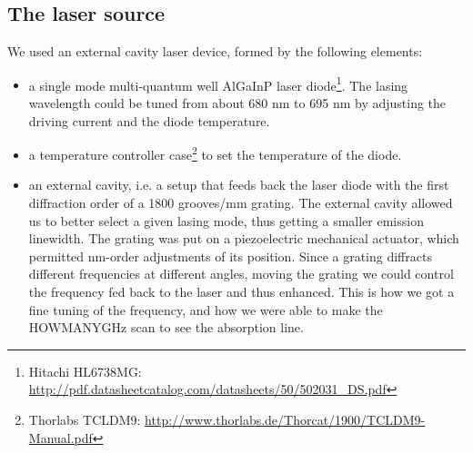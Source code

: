 \documentclass[a4paper,11pt]{article}
\begin{document}
\subsection{The laser source}
We used an external cavity laser device, formed by the following elements:
\begin{itemize}
\item a single mode multi-quantum well AlGaInP laser diode\footnote{Hitachi HL6738MG: \url{http://pdf.datasheetcatalog.com/datasheets/50/502031_DS.pdf}}.
 The lasing wavelength could be tuned from about 680 nm to 695 nm by adjusting the driving current and the diode temperature.
\item a temperature controller case\footnote{Thorlabs TCLDM9: \url{http://www.thorlabs.de/Thorcat/1900/TCLDM9-Manual.pdf}} to set the temperature of the diode. 
\item an external cavity, i.e. a setup that feeds back the laser diode with the first diffraction order of a 1800 grooves/mm grating. The external cavity allowed us to better select a given lasing mode, thus getting a smaller emission linewidth. The grating was put on a piezoelectric mechanical actuator, which permitted nm-order adjustments of its position. Since a grating diffracts different frequencies at different angles, moving the grating we could control the frequency fed back to the laser and thus enhanced. This is how we got a fine tuning of the frequency, and how we were able to make the HOWMANYGHz scan to see the absorption line. 
\end{itemize} 
\end{document}
